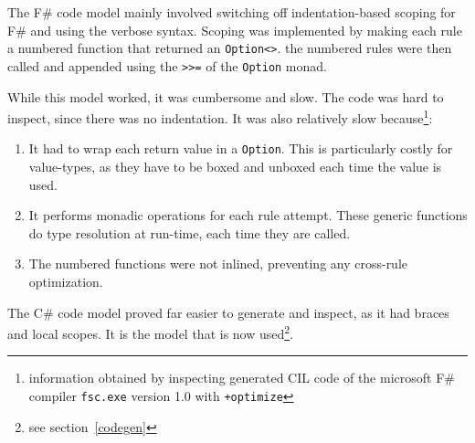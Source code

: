 The F\# code model mainly involved switching off indentation-based scoping for F\# and using the verbose syntax.
Scoping was implemented by making each rule a numbered function that returned an \verb|Option<>|.
the numbered rules were then called and appended using the \verb|>>=| of the \verb|Option| monad.

While this model worked, it was cumbersome and slow.
The code was hard to inspect, since there was no indentation.
It was also relatively slow because\footnote{information obtained by inspecting generated CIL code of the microsoft F\# compiler \texttt{fsc.exe} version 1.0 with \texttt{+optimize}}:

\begin{enumerate}
\item It had to wrap each return value in a \verb|Option|. 
    This is particularly costly for value-types, as they have to be boxed and unboxed each time the value is used.
\item It performs monadic operations for each rule attempt.
    These generic functions do type resolution at run-time, each time they are called.
\item The numbered functions were not inlined, preventing any cross-rule optimization.
\end{enumerate}

The C\# code model proved far easier to generate and inspect, as it had braces and local scopes.
It is the model that is now used\footnote{see section~\ref{codegen}}.
